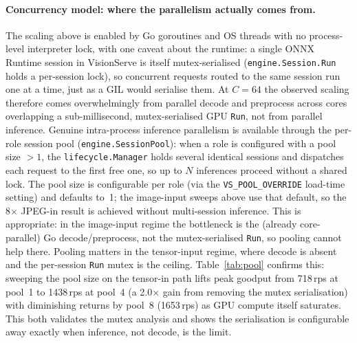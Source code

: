 \paragraph{Concurrency model: where the parallelism actually comes from.}
The scaling above is enabled by Go goroutines and OS threads with no process-level
interpreter lock, with one caveat about the runtime: a single ONNX Runtime
session in VisionServe is itself mutex-serialised (\texttt{engine.Session.Run} holds a
per-session lock), so concurrent requests routed to the same session run one at a time,
just as a GIL would serialise them.  At $C{=}64$ the observed scaling therefore comes
overwhelmingly from parallel decode and preprocess across cores overlapping a
sub-millisecond, mutex-serialised GPU \texttt{Run}, not from parallel inference.  Genuine
intra-process inference parallelism is available through the per-role session pool
(\texttt{engine.SessionPool}): when a role is configured with a pool size $>1$, the
\texttt{lifecycle.Manager} holds several identical sessions and dispatches each request to
the first free one, so up to $N$ inferences proceed without a shared lock.  The pool size
is configurable per role (via the \texttt{VS\_POOL\_OVERRIDE} load-time setting) and
defaults to~1; the image-input sweeps above use that default, so the 8$\times$ JPEG-in result
is achieved without multi-session inference.  This is appropriate: in the image-input
regime the bottleneck is the (already core-parallel) Go decode/preprocess, not the
mutex-serialised \texttt{Run}, so pooling cannot help there.  Pooling matters in the
tensor-input regime, where decode is absent and the per-session \texttt{Run} mutex
is the ceiling.  Table~\ref{tab:pool} confirms this: sweeping the pool size on the
tensor-in path lifts peak goodput from 718\,rps at pool~1 to 1438\,rps at pool~4 (a
2.0$\times$ gain from removing the mutex serialisation) with diminishing returns by pool~8
(1653\,rps) as GPU compute itself saturates.  This both validates the mutex analysis and shows
the serialisation is configurable away exactly when inference, not decode, is the limit.

